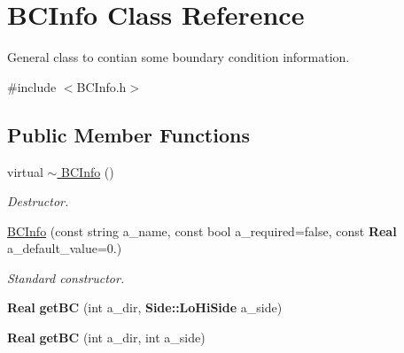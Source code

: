 \hypertarget{class_b_c_info}{}\section{B\+C\+Info Class Reference}
\label{class_b_c_info}


General class to contian some boundary condition information.  




{\ttfamily \#include $<$B\+C\+Info.\+h$>$}

\subsection*{Public Member Functions}
\begin{DoxyCompactItemize}
\item 
\mbox{\label{class_b_c_info_ae54656180d04287c737404cb21cd3c3f}} 
virtual \hyperlink{class_b_c_info_ae54656180d04287c737404cb21cd3c3f}{$\sim$ B\+C\+Info} ()
\begin{DoxyCompactList}\small\item\em Destructor. \end{DoxyCompactList}\item 
\mbox{\label{class_b_c_info_a773e9547fd2b267e42c178f6d647a771}} 
\hyperlink{class_b_c_info_a773e9547fd2b267e42c178f6d647a771}{B\+C\+Info} (const string a\+\_\+name, const bool a\+\_\+required=false, const \textbf{ Real} a\+\_\+default\+\_\+value=0.)
\begin{DoxyCompactList}\small\item\em Standard constructor. \end{DoxyCompactList}\item 
\mbox{\label{class_b_c_info_ae0d713e910efa1d53cdab3e11220071b}} 
\textbf{ Real} {\bfseries get\+BC} (int a\+\_\+dir, \textbf{ Side\+::\+Lo\+Hi\+Side} a\+\_\+side)
\item 
\mbox{\label{class_b_c_info_a089241a0e169503c2a2cc22c564f8a47}} 
\textbf{ Real} {\bfseries get\+BC} (int a\+\_\+dir, int a\+\_\+side)
\end{DoxyCompactItemize}
